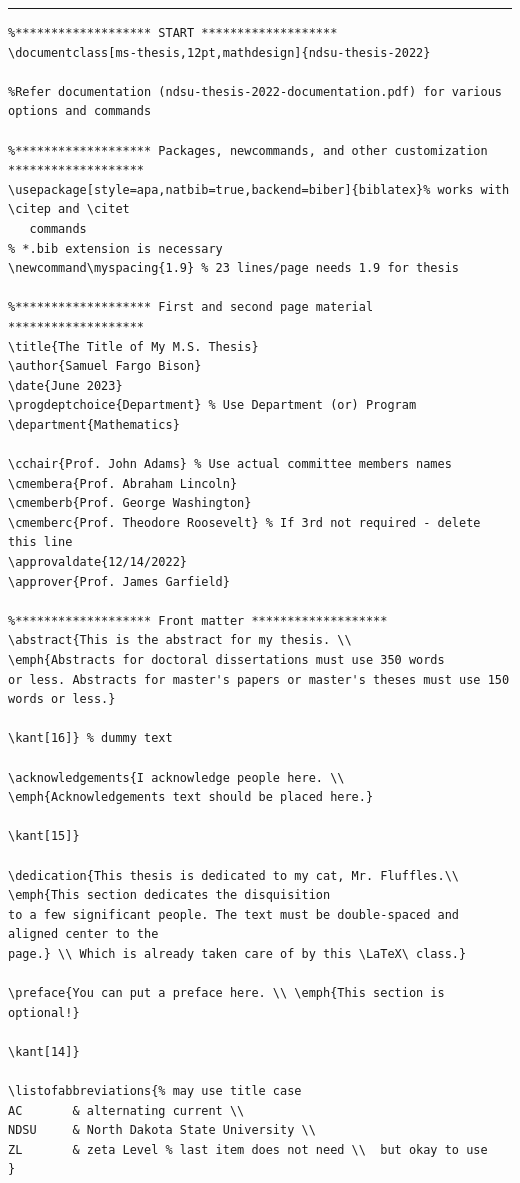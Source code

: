 \documentclass[letterpaper]{refart}
\begin{document}
\vspace{6mm}
\hrule
{\scriptsize
\begin{verbatim}
%******************* START *******************
\documentclass[ms-thesis,12pt,mathdesign]{ndsu-thesis-2022}

%Refer documentation (ndsu-thesis-2022-documentation.pdf) for various options and commands

%******************* Packages, newcommands, and other customization *******************
\usepackage[style=apa,natbib=true,backend=biber]{biblatex}% works with \citep and \citet 
   commands
% *.bib extension is necessary 
\newcommand\myspacing{1.9} % 23 lines/page needs 1.9 for thesis

%******************* First and second page material *******************
\title{The Title of My M.S. Thesis}
\author{Samuel Fargo Bison}
\date{June 2023}
\progdeptchoice{Department} % Use Department (or) Program
\department{Mathematics}

\cchair{Prof. John Adams} % Use actual committee members names 
\cmembera{Prof. Abraham Lincoln}
\cmemberb{Prof. George Washington}
\cmemberc{Prof. Theodore Roosevelt} % If 3rd not required - delete this line 
\approvaldate{12/14/2022}
\approver{Prof. James Garfield}

%******************* Front matter *******************
\abstract{This is the abstract for my thesis. \\ 
\emph{Abstracts for doctoral dissertations must use 350 words 
or less. Abstracts for master's papers or master's theses must use 150 words or less.}

\kant[16]} % dummy text

\acknowledgements{I acknowledge people here. \\ 
\emph{Acknowledgements text should be placed here.} 

\kant[15]}

\dedication{This thesis is dedicated to my cat, Mr. Fluffles.\\ 
\emph{This section dedicates the disquisition
to a few significant people. The text must be double-spaced and aligned center to the 
page.} \\ Which is already taken care of by this \LaTeX\ class.}

\preface{You can put a preface here. \\ \emph{This section is optional!} 

\kant[14]}

\listofabbreviations{% may use title case
AC       & alternating current \\
NDSU     & North Dakota State University \\
ZL       & zeta Level % last item does not need \\  but okay to use
}


\end{verbatim}}
\end{document}
